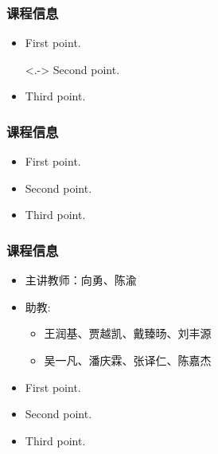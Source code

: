 \begin{frame}
	\frametitle{课程信息}
	
	\begin{itemize}[<+->]
		\item First point.
		\item[<.->] Second point.
		\item Third point.
	\end{itemize}
	
	
	
\end{frame}

\begin{frame}
	\frametitle{课程信息}
	
\begin{itemize}
	\item<1-| alert@1> First point.
	\item<2-| alert@2> Second point.
	\item<3-| alert@3> Third point.
\end{itemize}
	
	
\end{frame}

	
\begin{frame}
	\frametitle{课程信息}
	\begin{itemize}
		\item 主讲教师：向勇、陈渝

		\item 助教: 
\begin{itemize}
		\item<3-> 王润基、贾越凯、戴臻旸、刘丰源

		\item<3-> 吴一凡、潘庆霖、张译仁、陈嘉杰
	\end{itemize}
	\end{itemize}

\begin{itemize}
	\item<1-> First point.
	\item<2-> Second point.
	\item<3-> Third point.
\end{itemize}


\end{frame}

